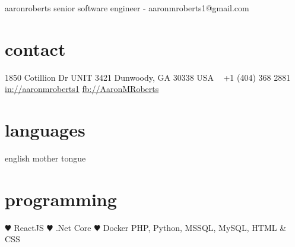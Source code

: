 \documentclass[]{friggeri-cv} %
\begin{document}
\header
{aaron}{roberts}
{senior software engineer - aaronmroberts1@gmail.com}


\begin{aside} %
\section{contact}
1850 Cotillion Dr
UNIT 3421
Dunwoody, GA 30338
USA
~
+1 (404) 368 2881
~
\href{https://www.linkedin.com/in/aaronmroberts1/}{in://aaronmroberts1}
\href{https://www.facebook.com/AaronMRoberts}{fb://AaronMRoberts}
\section{languages}
english mother tongue
\section{programming}
{\color{red} $\varheartsuit$} ReactJS
{\color{red} $\varheartsuit$} .Net Core
{\color{red} $\varheartsuit$} Docker
PHP, Python, MSSQL, MySQL, HTML \& CSS
\end{aside}

\end{document}
